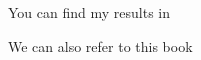 \documentclass[10pt,a5paper]{article}
\begin{document}
\cite{knuth68}

You can find my results in \cite{th}

We can also refer to this book \cite{rudin}



\end{document}
